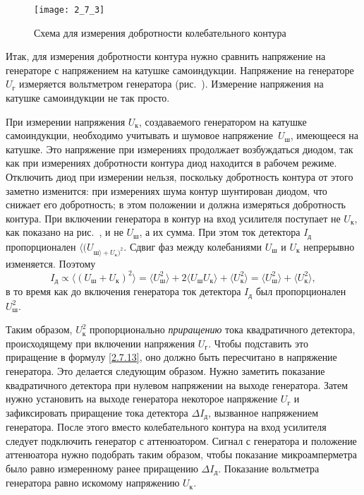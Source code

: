 \begin{figure}[h!]
	\texttt{[image: 2\_7\_3]}
	\caption{Схема для измерения добротности колебательного контура}
\end{figure}

Итак, для измерения добротности контура нужно сравнить напряжение на генераторе с напряжением на катушке самоиндукции.
Напряжение на генераторе $U_{\text{г}}$ измеряется вольтметром генератора (рис.~). Измерение напряжения на катушке самоиндукции
не так просто.

При измерении напряжения $U_{\text{к}}$, создаваемого генератором на катушке самоиндукции, необходимо учитывать и шумовое
напряжение~$U_{\text{ш}}$, имеющееся на катушке. Это напряжение при измерениях продолжает возбуждаться диодом, так как при
измерениях добротности контура диод находится в рабочем режиме. Отключить диод при измерении нельзя, поскольку
добротность контура от этого заметно изменится: при измерениях шума контур шунтирован диодом, что снижает его
добротность; в этом положении и должна измеряться добротность контура. При включении генератора в контур на вход
усилителя поступает не $U_{\text{к}}$, как показано на рис.~, и не $U_{\text{ш}}$, а их сумма. При этом ток детектора $I_{\text{д}}$ пропорционален
$\langle (U_{\text{ш}\rangle+U_{\text{к}})^2}$. Сдвиг фаз между колебаниями $U_{\text{ш}}$ и $U_{\text{к}}$ непрерывно изменяется. Поэтому
\begin{equation*}
I_{\text{д}}\propto\langle (U_{\text{ш}}+U_{\text{к}})^2\rangle=\langle U_{\text{ш}}^2\rangle+2\langle U_{\text{ш}}U_{\text{к}}\rangle+\langle U_{\text{к}}^2\rangle=\langle U_{\text{ш}}^2\rangle+\langle U_{\text{к}}^2\rangle,
\end{equation*}
в то время как до включения генератора ток детектора $I_{\text{д}}$ был пропорционален $U_{\text{ш}}^2$.

Таким образом, $U_{\text{к}}^2$ пропорционально \emph{приращению} тока квадратичного детектора, происходящему при включении
напряжения $U_{\text{г}}$. Чтобы подставить это приращение в формулу \eqref{2.7.13}, оно должно быть пересчитано в напряжение
генератора. Это делается следующим образом. Нужно заметить показание квадратичного детектора при нулевом напряжении на
выходе генератора. Затем нужно установить на выходе генератора некоторое напряжение $U_{\text{г}}$ и зафиксировать приращение
тока детектора $\Delta I_{\text{д}}$, вызванное напряжением генератора. После этого вместо колебательного контура на вход усилителя
следует подключить генератор с аттенюатором. Сигнал с генератора и положение аттенюатора нужно подобрать таким образом,
чтобы показание микроамперметра было равно измеренному ранее приращению $\Delta I_{\text{д}}$. Показание вольтметра генератора равно
искомому напряжению $U_{\text{к}}$.

